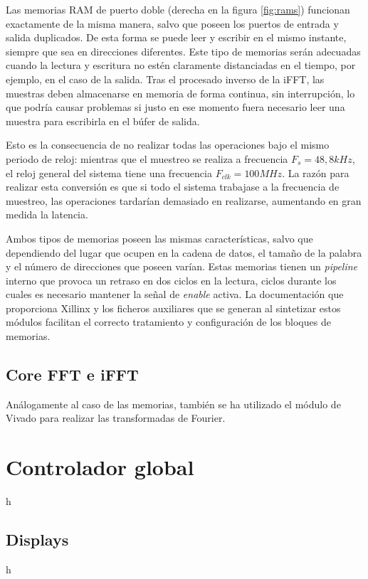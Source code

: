 Las memorias RAM de puerto doble (derecha en la figura \ref{fig:rams}) funcionan exactamente de la misma manera, salvo que poseen los puertos de entrada y salida duplicados. De esta forma se puede leer y escribir en el mismo instante, siempre que sea en direcciones diferentes. Este tipo de memorias serán adecuadas cuando la lectura y escritura no estén claramente distanciadas en el tiempo, por ejemplo, en el caso de la salida. Tras el procesado inverso de la iFFT, las muestras deben almacenarse en memoria de forma continua, sin interrupción, lo que podría causar problemas si justo en ese momento fuera necesario leer una muestra para escribirla en el búfer de salida.

Esto es la consecuencia de no realizar todas las operaciones bajo el mismo periodo de reloj: mientras que el muestreo se realiza a frecuencia $F_{s}=48,8kHz$, el reloj general del sistema tiene una frecuencia $F_{clk} = 100MHz$. La razón para realizar esta conversión es que si todo el sistema trabajase a la frecuencia de muestreo, las operaciones tardarían demasiado en realizarse, aumentando en gran medida la latencia. 

Ambos tipos de memorias poseen las mismas características, salvo que dependiendo del lugar que ocupen en la cadena de datos, el tamaño de la palabra y el número de direcciones que poseen varían. Estas memorias tienen un \emph{pipeline} interno que provoca un retraso en dos ciclos en la lectura, ciclos durante los cuales es necesario mantener la señal de \emph{enable} activa. La documentación que proporciona Xillinx y los ficheros auxiliares que se generan al sintetizar estos módulos facilitan el correcto tratamiento y configuración de los bloques de memorias.

\subsection{Core FFT e iFFT}
Análogamente al caso de las memorias, también se ha utilizado el módulo de Vivado para realizar las transformadas de Fourier.
\section{Controlador global}
h
\subsection{Displays}
h 